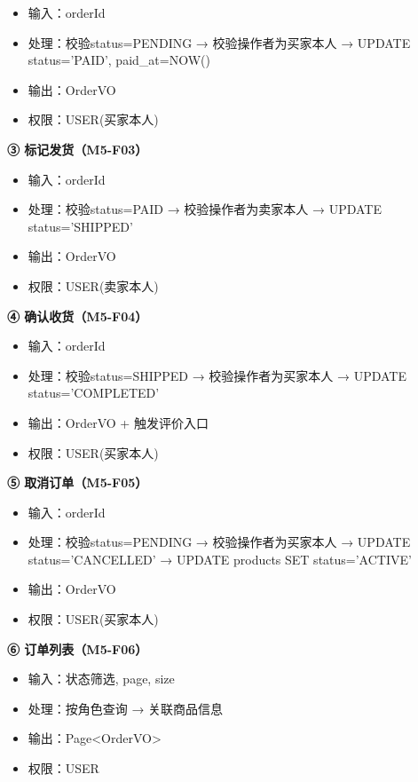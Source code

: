 \documentclass[12pt,a4paper]{ctexart}
\numberwithin{figure}{section}
\numberwithin{table}{section}
\begin{document}
\begin{itemize}
    \item 输入：orderId
    \item 处理：校验status=PENDING → 校验操作者为买家本人 → UPDATE status='PAID', paid\_at=NOW()
    \item 输出：OrderVO
    \item 权限：USER(买家本人)
\end{itemize}

\textbf{③ 标记发货（M5-F03）}

\begin{itemize}
    \item 输入：orderId
    \item 处理：校验status=PAID → 校验操作者为卖家本人 → UPDATE status='SHIPPED'
    \item 输出：OrderVO
    \item 权限：USER(卖家本人)
\end{itemize}

\textbf{④ 确认收货（M5-F04）}

\begin{itemize}
    \item 输入：orderId
    \item 处理：校验status=SHIPPED → 校验操作者为买家本人 → UPDATE status='COMPLETED'
    \item 输出：OrderVO + 触发评价入口
    \item 权限：USER(买家本人)
\end{itemize}

\textbf{⑤ 取消订单（M5-F05）}

\begin{itemize}
    \item 输入：orderId
    \item 处理：校验status=PENDING → 校验操作者为买家本人 → UPDATE status='CANCELLED' → UPDATE products SET status='ACTIVE'
    \item 输出：OrderVO
    \item 权限：USER(买家本人)
\end{itemize}

\textbf{⑥ 订单列表（M5-F06）}

\begin{itemize}
    \item 输入：状态筛选, page, size
    \item 处理：按角色查询 → 关联商品信息
    \item 输出：Page<OrderVO>
    \item 权限：USER
\end{itemize}
\end{document}
